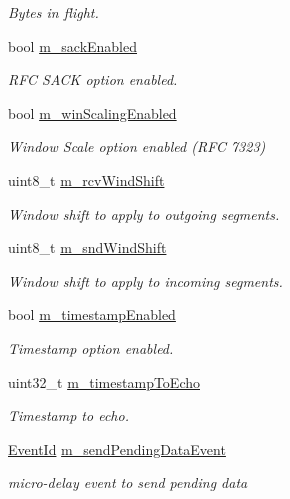 \begin{DoxyCompactItemize}
\begin{DoxyCompactList}\small\item\em Bytes in flight. \end{DoxyCompactList}\item 
bool \hyperlink{classns3_1_1TcpSocketBase_af79c709855a362f331251ef73167209a}{m\+\_\+sack\+Enabled}
\begin{DoxyCompactList}\small\item\em R\+FC S\+A\+CK option enabled. \end{DoxyCompactList}\item 
bool \hyperlink{classns3_1_1TcpSocketBase_a80ff21f228d3334f17dcf56f14fa0c7c}{m\+\_\+win\+Scaling\+Enabled}
\begin{DoxyCompactList}\small\item\em Window Scale option enabled (R\+FC 7323) \end{DoxyCompactList}\item 
uint8\+\_\+t \hyperlink{classns3_1_1TcpSocketBase_a045fc4c0c16f906c5ec43d853cdb599f}{m\+\_\+rcv\+Wind\+Shift}
\begin{DoxyCompactList}\small\item\em Window shift to apply to outgoing segments. \end{DoxyCompactList}\item 
uint8\+\_\+t \hyperlink{classns3_1_1TcpSocketBase_a249576feb9975ab927aeeda274d9bef0}{m\+\_\+snd\+Wind\+Shift}
\begin{DoxyCompactList}\small\item\em Window shift to apply to incoming segments. \end{DoxyCompactList}\item 
bool \hyperlink{classns3_1_1TcpSocketBase_a5a7f7e51b07e27a908d4bab44028eee1}{m\+\_\+timestamp\+Enabled}
\begin{DoxyCompactList}\small\item\em Timestamp option enabled. \end{DoxyCompactList}\item 
uint32\+\_\+t \hyperlink{classns3_1_1TcpSocketBase_ab3fdcb2bbc5e6a064e004e0671875996}{m\+\_\+timestamp\+To\+Echo}
\begin{DoxyCompactList}\small\item\em Timestamp to echo. \end{DoxyCompactList}\item 
\hyperlink{classns3_1_1EventId}{Event\+Id} \hyperlink{classns3_1_1TcpSocketBase_a84be5c63b5ebf8e2452b43f9def59cab}{m\+\_\+send\+Pending\+Data\+Event}
\begin{DoxyCompactList}\small\item\em micro-\/delay event to send pending data \end{DoxyCompactList}\item 

\end{DoxyCompactItemize}
